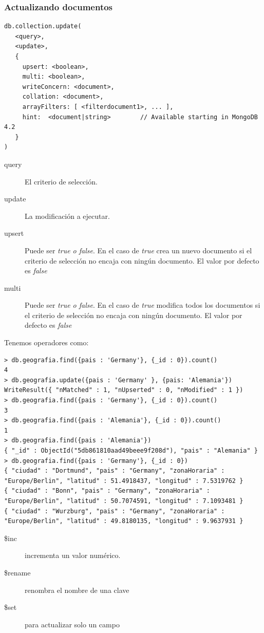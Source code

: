 \documentclass[4paper]{article}
\begin{document}
\subsubsection{Actualizando documentos}
\begin{lstlisting}
db.collection.update(
   <query>,
   <update>,
   {
     upsert: <boolean>,
     multi: <boolean>,
     writeConcern: <document>,
     collation: <document>,
     arrayFilters: [ <filterdocument1>, ... ],
     hint:  <document|string>        // Available starting in MongoDB 4.2
   }
)
\end{lstlisting}
\begin{description}
\item[query] El criterio de selección.
\item[update] La modificación a ejecutar.
\item[upsert] Puede ser \emph{true o false}. En el caso de \emph{true} crea un nuevo documento si el criterio de selección no encaja con ningún documento. El valor por defecto es \emph{false}
\item[multi] Puede ser \emph{true o false}. En el caso de \emph{true} modifica todos los documentos si el criterio de selección no encaja con ningún documento. El valor por defecto es \emph{false}
\end{description}
Tenemos operadores como:


\begin{lstlisting}
> db.geografia.find({pais : 'Germany'}, {_id : 0}).count()
4
> db.geografia.update({pais : 'Germany' }, {pais: 'Alemania'})
WriteResult({ "nMatched" : 1, "nUpserted" : 0, "nModified" : 1 })
> db.geografia.find({pais : 'Germany'}, {_id : 0}).count()
3
> db.geografia.find({pais : 'Alemania'}, {_id : 0}).count()
1
> db.geografia.find({pais : 'Alemania'})
{ "_id" : ObjectId("5db861810aad49beee9f208d"), "pais" : "Alemania" }
> db.geografia.find({pais : 'Germany'}, {_id : 0})
{ "ciudad" : "Dortmund", "pais" : "Germany", "zonaHoraria" : "Europe/Berlin", "latitud" : 51.4918437, "longitud" : 7.5319762 }
{ "ciudad" : "Bonn", "pais" : "Germany", "zonaHoraria" : "Europe/Berlin", "latitud" : 50.7074591, "longitud" : 7.1093481 }
{ "ciudad" : "Wurzburg", "pais" : "Germany", "zonaHoraria" : "Europe/Berlin", "latitud" : 49.8180135, "longitud" : 9.9637931 }
\end{lstlisting}

\newpage

\begin{description}
\item[\$inc] incrementa un valor numérico.
\item[\$rename] renombra el nombre de una clave
\item[\$set] para actualizar solo un campo
\end{description}
\end{document}
